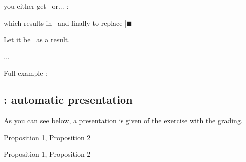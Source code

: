 \begin{tkzexample}
 \newcommand*{\altersquare}{\mbox{\vbox{\hrule\hbox to 6pt{\vrule height 5.2pt \hfil\vrule}\hrule}}}\end{tkzexample}

\medskip you either get \altersquare\ or... :

\begin{tkzexample}
 \newcommand*{\dingsquare}{\ding{114}} \end{tkzexample}

\medskip which results in \dingsquare\ and finally to replace |$\blacksquare$| 

\begin{tkzexample}
 \newcommand*{\dingchecksquare}{\mbox{\ding{114}%
 \hspace{-.7em}\raisebox{.2ex}[1ex]{\ding{51}}}} \end{tkzexample}

\medskip Let it be \dingchecksquare\ as a result. 


\begin{tkzexample} 

 \begin{alterqcm}[lq=90mm,symb=\altersquare]
 ... \end{alterqcm}\end{tkzexample}

\medskip
Full example :

\medskip
\begin{tkzexample}[vbox]
 \begin{alterqcm}[VF,lq=125mm,symb    = \dingsquare]
 \AQquestion{For all $x \in ]-3~;~2],~f'(x) \geqslant 0$.}
 \end{alterqcm}\end{tkzexample}
  

\subsection{ : automatic presentation }
As you can see below, a presentation is given of the exercise with the grading.

\bigskip
\begin{minipage}[c][][t]{.45\linewidth}
\begin{tkzexample}
  \begin{alterqcm}[lq=6cm,pre=true,bonus=1,malus={0,5}]
  {{Proposition 1},
   {Proposition 2}}
  \end{alterqcm}\end{tkzexample}
\end{minipage}\hfill
\begin{minipage}[c][][t]{.45\linewidth}
  \begin{alterqcm}[lq=3cm,pre=true,bonus=1,malus={0,5}]
  {{Proposition 1},
   {Proposition 2}}
  \end{alterqcm}
\end{minipage}


